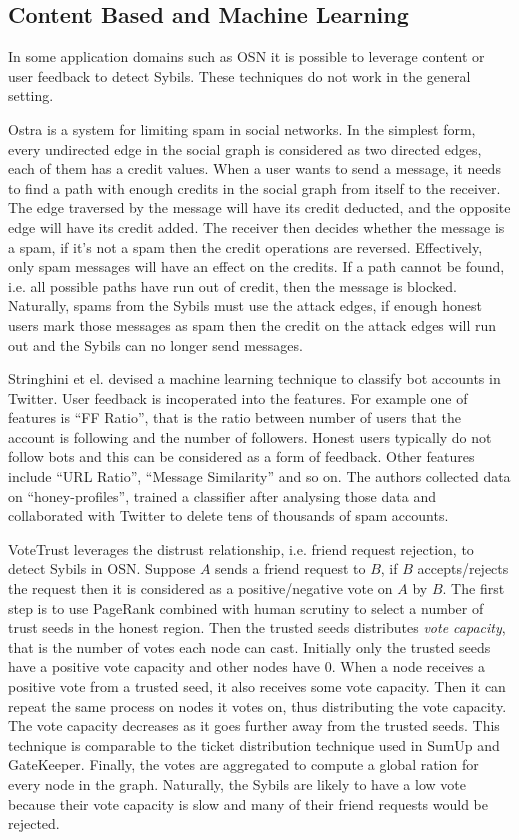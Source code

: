 
\subsection{Content Based and Machine Learning}
In some application domains such as OSN it is possible to leverage content or
user feedback to detect Sybils. These techniques do not work in the general
setting.

Ostra\cite{mislove2008ostra} is a system for limiting spam in social networks.
In the simplest form, every undirected edge in the social graph is considered as
two directed edges, each of them has a credit values. When a user wants to send
a message, it needs to find a path with enough credits in the social graph from
itself to the receiver. The edge traversed by the message will have its credit
deducted, and the opposite edge will have its credit added. The receiver then
decides whether the message is a spam, if it's not a spam then the credit
operations are reversed. Effectively, only spam messages will have an effect on
the credits. If a path cannot be found, i.e. all possible paths have run out of
credit, then the message is blocked. Naturally, spams from the Sybils must use
the attack edges, if enough honest users mark those messages as spam then the
credit on the attack edges will run out and the Sybils can no longer send
messages.

Stringhini et el. devised a machine learning technique to classify bot accounts 
in Twitter\cite{stringhini2010detecting}. User feedback is incoperated into the
features. For example one of features is ``FF Ratio'', that is the ratio between
number of users that the account is following and the number of followers.
Honest users typically do not follow bots and this can be considered as a form
of feedback. Other features include ``URL Ratio'', ``Message Similarity'' and so
on. The authors collected data on ``honey-profiles'', trained a classifier after
analysing those data and collaborated with Twitter to delete tens of thousands
of spam accounts.

VoteTrust\cite{xue2013votetrust} leverages the distrust relationship, i.e.
friend request rejection, to detect Sybils in OSN. Suppose $A$ sends a friend
request to $B$, if $B$ accepts/rejects the request then it is considered as a
positive/negative vote on $A$ by $B$. The first step is to use PageRank combined
with human scrutiny to select a number of trust seeds in the honest region. Then
the trusted seeds distributes \emph{vote capacity}, that is the number of votes
each node can cast. Initially only the trusted seeds have a positive vote
capacity and other nodes have 0. When a node receives a positive vote from a
trusted seed, it also receives some vote capacity. Then it can repeat the same
process on nodes it votes on, thus distributing the vote capacity. The vote
capacity decreases as it goes further away from the trusted seeds. This
technique is comparable to the ticket distribution technique used in SumUp and
GateKeeper. Finally, the votes are aggregated to compute a global ration for
every node in the graph. Naturally, the Sybils are likely to have a low vote
because their vote capacity is slow and many of their friend requests would be
rejected.

